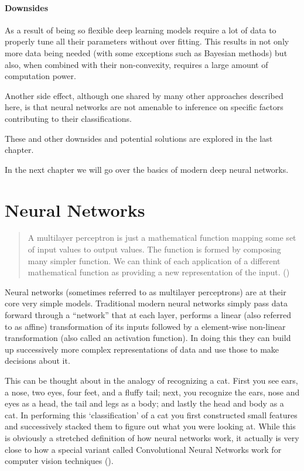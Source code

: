 \documentclass[]{book}
\theoremstyle{definition}
\theoremstyle{definition}
\theoremstyle{definition}
\theoremstyle{remark}
\begin{document}
\subsubsection{Downsides}\label{downsides}

As a result of being so flexible deep learning models require a lot of
data to properly tune all their parameters without over fitting. This
results in not only more data being needed (with some exceptions such as
Bayesian methods) but also, when combined with their non-convexity,
requires a large amount of computation power.

Another side effect, although one shared by many other approaches
described here, is that neural networks are not amenable to inference on
specific factors contributing to their classifications.

These and other downsides and potential solutions are explored in the
last chapter.

In the next chapter we will go over the basics of modern deep neural
networks.

\chapter{Neural Networks}\label{neuralnetworks}

\begin{quote}
A multilayer perceptron is just a mathematical function mapping some set
of input values to output values. The function is formed by composing
many simpler function. We can think of each application of a different
mathematical function as providing a new representation of the input.
(\citet{goodfellow_DL})
\end{quote}

Neural networks (sometimes referred to as multilayer perceptrons) are at
their core very simple models. Traditional modern neural networks simply
pass data forward through a ``network'' that at each layer, performs a
linear (also referred to as affine) transformation of its inputs
followed by a element-wise non-linear transformation (also called an
activation function). In doing this they can build up successively more
complex representations of data and use those to make decisions about
it.

This can be thought about in the analogy of recognizing a cat. First you
see ears, a nose, two eyes, four feet, and a fluffy tail; next, you
recognize the ears, nose and eyes as a head, the tail and legs as a
body; and lastly the head and body as a cat. In performing this
`classification' of a cat you first constructed small features and
successively stacked them to figure out what you were looking at. While
this is obviously a stretched definition of how neural networks work, it
actually is very close to how a special variant called Convolutional
Neural Networks work for computer vision techniques (\citet{cnn_vis}).
\end{document}
